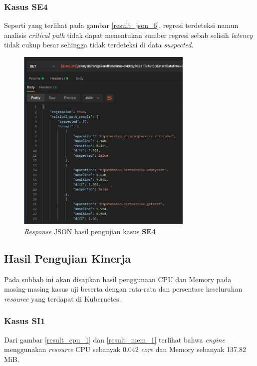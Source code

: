 \subsubsection{Kasus SE4}
Seperti yang terlihat pada gambar \ref{result_json_6}, regresi terdeteksi namun analisis \textit{critical path} tidak dapat menentukan sumber regresi sebab selisih \textit{latency} tidak cukup besar sehingga tidak terdeteksi di data \textit{suspected}.
\begin{figure}[!htb]
	\centering
	\includegraphics[width=0.75\textwidth]{resources/ch4/json/11.png}
	\caption{\textit{Response} JSON hasil pengujian kasus \textbf{SE4}}
	\label{result_json_9}
\end{figure}

\pagebreak

\subsection{Hasil Pengujian Kinerja}
Pada subbab ini akan disajikan hasil penggunaan CPU dan Memory pada masing-masing kasus uji beserta dengan rata-rata dan persentase keseluruhan \textit{resource} yang terdapat di Kubernetes. 
                           
\subsubsection{Kasus SI1}
Dari gambar \ref{result_cpu_1} dan \ref{result_mem_1} terlihat bahwa \textit{engine} menggunakan \textit{resource} CPU sebanyak 0.042 \textit{core} dan Memory sebanyak 137.82 MiB. 

